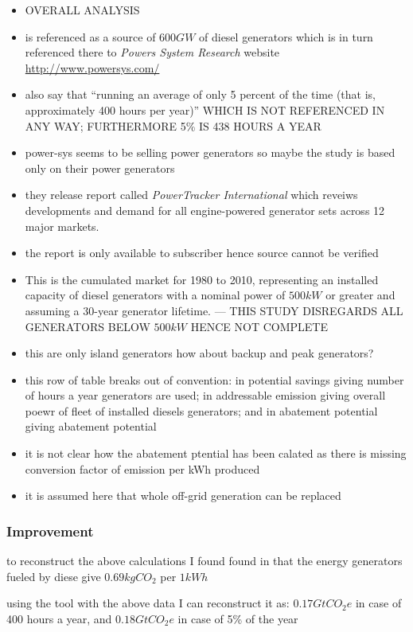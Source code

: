 \documentclass[11pt, twocolumn]{article}
\begin{document}
\begin{itemize}
\item OVERALL ANALYSIS
\item \citep{pieper2011revisiting} is referenced as a source of $600GW$ of diesel generators which is in turn referenced there to \emph{Powers System Research} website \url{http://www.powersys.com/}
\item also \citep{pieper2011revisiting} say that ``running an average of only 5 percent of the time (that is, approximately 400 hours per year)'' WHICH IS NOT REFERENCED IN ANY WAY; FURTHERMORE 5\% IS 438 HOURS A YEAR
\item power-sys seems to be selling power generators so maybe the study is based only on their power generators
\item they release report called \emph{PowerTracker International} which reveiws developments and demand for all engine-powered generator sets across 12 major markets.
\item the report is only available to subscriber hence source cannot be verified
\item  This is the cumulated market for 1980 to 2010, representing an installed capacity of diesel generators with a nominal power of $500 kW$ or greater and assuming a 30-year generator lifetime. --- THIS STUDY DISREGARDS ALL GENERATORS BELOW $500 kW$ HENCE NOT COMPLETE
\item this are only island generators how about backup and peak generators?
\item this row of table breaks out of convention: in potential savings giving number of hours a year generators are used; in addressable emission giving overall poewr of fleet of installed diesels generators; and in abatement potential giving abatement potential
\item it is not clear how the abatement ptential has been calated as there is missing conversion factor of emission per kWh produced 

\item it is assumed here that whole off-grid generation can be replaced

\end{itemize}
\subsubsection{Improvement}
\item to reconstruct the above calculations I found found in \citep{iea2012co2} that the energy generators fueled by diese give $0.69 kgCO_2$ per $1kWh$
\item using the tool with the above data I can reconstruct it as: $0.17 GtCO_2e$ in case of 400 hours a year, and $0.18 GtCO_2e$ in case of 5\% of the year
\end{document}
